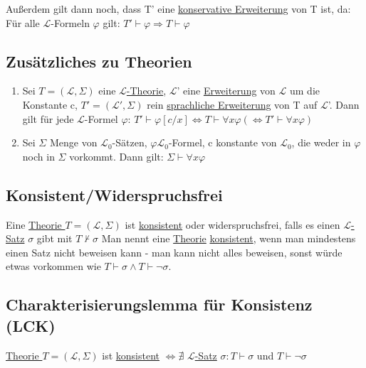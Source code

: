 \documentclass[12pt,a4paper]{article} %
\begin{document}
	Außerdem gilt dann noch, dass T' eine \hyperref[Erweiterung]{konservative Erweiterung} von T ist, da: Für alle $\mathcal{L}$-Formeln $\varphi$ gilt: $T' \hyperref[Beweisbar]{\vdash} \varphi \Rightarrow T \hyperref[Beweisbar]{\vdash} \varphi$
	
	\subsection{Zusätzliches zu Theorien}
	\begin{enumerate}
		\item Sei $T = (\mathcal{L}, \Sigma)$ eine \hyperref[Theorie]{$\mathcal{L}$-Theorie}, $\mathcal{L}$' eine \hyperref[Erweiterung]{Erweiterung} von $\mathcal{L}$ um die Konstante c, $T' = (\mathcal{L}', \Sigma)$ rein \hyperref[SprachlicheErweiterung]{sprachliche Erweiterung} von T auf $\mathcal{L}$'. Dann gilt für jede $\mathcal{L}$-Formel $\varphi$: $T' \hyperref[Beweisbar]{\vdash} \varphi[c/x] \Leftrightarrow T \hyperref[Beweisbar]{\vdash} \forall x \varphi (\Leftrightarrow T' \hyperref[Beweisbar]{\vdash} \forall x \varphi)$
		\item Sei $\Sigma$ Menge von $\mathcal{L}_0$-Sätzen, $\varphi \mathcal{L}_0$-Formel, c konstante von $\mathcal{L}_0$, die weder in $\varphi$ noch in $\Sigma$ vorkommt. Dann gilt: $\Sigma \hyperref[Beweisbar]{\vdash} \forall x \varphi$
	\end{enumerate}
	
	\subsection{Konsistent/Widerspruchsfrei}
	\label{PLKonsistent}
	Eine \hyperref[Theorie]{Theorie $T = (\mathcal{L}, \Sigma)$} ist \hyperref[PLKonsistent]{konsistent} oder widerspruchsfrei, falls es einen
	\hyperref[LSatz]{$\mathcal{L}$-Satz} $\sigma$ gibt mit $T \nvdash \sigma$
	Man nennt eine \hyperref[Theorie]{Theorie} \hyperref[PLKonsistent]{konsistent}, wenn man mindestens einen Satz
	nicht beweisen kann - man kann nicht alles beweisen, sonst würde etwas 
	vorkommen wie $T \hyperref[Beweisbar]{\vdash} \sigma \land T \hyperref[Beweisbar]{\vdash} \neg \sigma$.
	
	\subsection{Charakterisierungslemma für Konsistenz (LCK)}
	\hyperref[Theorie]{Theorie $T = (\mathcal{L}, \Sigma)$} ist \hyperref[PLKonsistent]{konsistent} $\Leftrightarrow \nexists$ \hyperref[LSatz]{$\mathcal{L}$-Satz} $\sigma : T \hyperref[Beweisbar]{\vdash} \sigma$ und $T \hyperref[Beweisbar]{\vdash} \neg \sigma$
	
\end{document}
